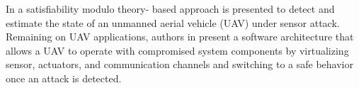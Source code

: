 \documentclass[letterpaper, 10 pt, conference]{ieeeconf}  %
\newcommand\NB[1]{$\spadesuit$\footnote{NB: #1}}
\begin{document}
In \cite{shoukry2015secure} a satisfiability modulo theory- based approach is presented to detect and estimate the state of an unmanned aerial vehicle (UAV) under sensor attack. Remaining on UAV applications, authors in \cite{yoon2017virtualdrone} present a software architecture that allows a UAV to operate with compromised system components by virtualizing sensor, actuators, and communication channels and switching to a safe behavior once an attack is detected. 

\end{document}
